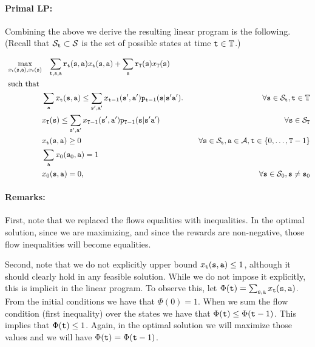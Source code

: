 \paragraph{Primal LP:}
%
Combining the above we derive the resulting linear program is the following.
%
(Recall that ${\mathcal{S}_{\tt t}} \subset \mathcal{S}$ is the set of possible states at time ${\tt t}\in {\mathbb{T}}$.)

\begin{align*}
\max_{x_{\tt t}({\tt s},{\tt a}),x_{{\tt T}}({\tt s})}&\;\;\;
\sum_{{\tt t},{\tt s},{\tt a}}
{\tt r}_{{\tt t}}({\tt s},{\tt a})x_{{\tt t}}({\tt s},{\tt a})+\sum_{{\tt s}}{\tt r}_{{\tt T}}({\tt s})x_{{\tt T}}({\tt s})\\
\mbox{ such that }&\\
&\sum_{{\tt a}} x_{{\tt t}}({\tt s},{\tt a})\leq
\sum_{{\tt s}',{\tt a}'}
x_{{\tt t}-1}({\tt s}',{\tt a}'){\tt p}_{{\tt t}-1}({\tt s}|{\tt s}'{\tt a}').
 &\quad\forall
{\tt s} \in {\mathcal{S}_{{\tt t}}},
{\tt t}\in\mathbb{T}\\
&x_{{\tt T}}({\tt s})\leq \sum_{{\tt s}',{\tt a}'}
x_{{\tt T}-1}({\tt s}',{\tt a}'){\tt p}_{{\tt T}-1}({\tt s}|{\tt s}'{\tt a}')
&\quad\forall {\tt s} \in
{\mathcal{S}_{{\tt T}}}\\
&x_{{\tt t}}({\tt s},{\tt a}) \geq 0  &\quad\forall {\tt s} \in
{\mathcal{S}_{{\tt t}}}, {\tt a}\in\mathcal{A},
{\tt t}\in\{0,\ldots,{\tt T}-1\}\\
&\sum_{{\tt a}}x_{0}({\tt s}_0,{\tt a})=1\\
&x_{0}({\tt s},{\tt a})=0,  &\quad\forall {\tt s} \in {\mathcal{S}_{0}},
{\tt s}\neq {\tt s}_0\\
\end{align*}

\paragraph{Remarks:}
First, note that we replaced the flows equalities with inequalities.
In the optimal solution, since we are maximizing, and since the rewards are non-negative, those flow inequalities will become equalities.

Second, note that we do not explicitly upper bound 
$x_{{\tt t}}({\tt s},{\tt a}) \leq 1 $, although it should clearly hold in any feasible solution.
While we do not impose it explicitly, this is implicit in
the linear program. To observe this, let $\Phi({\tt t})= \sum_{{\tt s},{\tt a}}
x_{{\tt t}}({\tt s},{\tt a})$. From the initial conditions we have
that $\Phi(0)=1$. When we sum the flow condition
(first inequality) over the states we have that $\Phi({\tt t})\leq\Phi({\tt t}-1)$.
This implies that $\Phi({\tt t})\leq 1$.
Again, in the optimal solution we will maximize those values and we will have $\Phi({\tt t})=\Phi({\tt t}-1)$.

